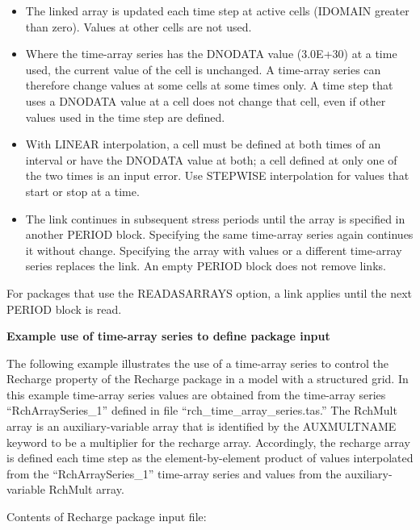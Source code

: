 \begin{itemize}
\item The linked array is updated each time step at active cells (IDOMAIN greater than zero). Values at other cells are not used.
\item Where the time-array series has the DNODATA value (3.0E+30) at a time used, the current value of the cell is unchanged. A time-array series can therefore change values at some cells at some times only. A time step that uses a DNODATA value at a cell does not change that cell, even if other values used in the time step are defined.
\item With LINEAR interpolation, a cell must be defined at both times of an interval or have the DNODATA value at both; a cell defined at only one of the two times is an input error. Use STEPWISE interpolation for values that start or stop at a time.
\item The link continues in subsequent stress periods until the array is specified in another PERIOD block. Specifying the same time-array series again continues it without change. Specifying the array with values or a different time-array series replaces the link. An empty PERIOD block does not remove links.
\end{itemize}

For packages that use the READASARRAYS option, a link applies until the next PERIOD block is read.

\vspace{5 mm}

\noindent \textbf{Example use of time-array series to define package input}

The following example illustrates the use of a time-array series to control the Recharge property of the Recharge package in a model with a structured grid. In this example time-array series values are obtained from the time-array series ``RchArraySeries\_1'' defined in file ``rch\_time\_array\_series.tas.'' The RchMult array is an auxiliary-variable array that is identified by the AUXMULTNAME keyword to be a multiplier for the recharge array. Accordingly, the recharge array is defined each time step as the element-by-element product of values interpolated from the ``RchArraySeries\_1'' time-array series and values from the auxiliary-variable RchMult array.

\vspace{5 mm}

Contents of Recharge package input file:

